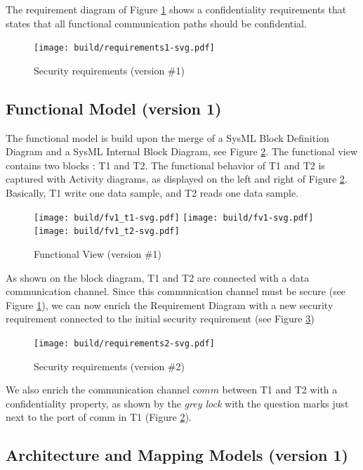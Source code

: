 \documentclass[12pt]{article}
\begin{document}
The requirement diagram of Figure \ref{fig:req1} shows a confidentiality requirements that states that all functional communication paths should be confidential.

\begin{figure}[htbp]
\centering
\texttt{[image: build/requirements1-svg.pdf]}
\caption{Security requirements (version \#1)} \label{fig:req1}
\end{figure}

\subsection{Functional Model (version 1)}
The functional model is build upon the merge of a  SysML Block Definition Diagram and a SysML Internal Block Diagram, see Figure \ref{fig:fv1}. The functional view contains two blocks : T1 and T2.  The functional behavior of T1 and T2 is captured with Activity diagrams, as displayed on the left and right of Figure \ref{fig:fv1}. Basically, T1 write one data sample, and T2 reads one data sample.


\begin{figure}[htbp]
\centering
\texttt{[image: build/fv1\_t1-svg.pdf]}
\texttt{[image: build/fv1-svg.pdf]}
\texttt{[image: build/fv1\_t2-svg.pdf]}
\caption{Functional View (version \#1)} \label{fig:fv1}
\end{figure}

As shown on the block diagram, T1 and T2 are connected with a data communication channel. Since this communication channel must be secure (see Figure \ref{fig:req1}), we can now enrich the Requirement Diagram with a new security requirement connected to the initial security requirement (see Figure \ref{fig:req2})

\begin{figure}[htbp]
\centering
\texttt{[image: build/requirements2-svg.pdf]}
\caption{Security requirements (version \#2)} \label{fig:req2}
\end{figure}

We also enrich the communication channel $comm$ between T1 and T2 with a confidentiality property, as shown by the \textit{grey lock} with the question marks just next to the port of comm in T1 (Figure \ref{fig:fv1}).

\subsection{Architecture and Mapping Models (version 1)}
\end{document}
